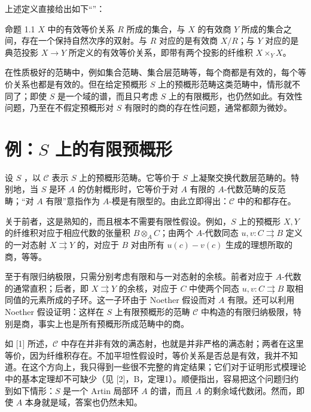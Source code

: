 上述定义直接给出如下“”：

\begin{statement}{命题 1.1}
$X$ 中的有效等价关系 $R$ 所成的集合，与 $X$ 的有效商 $Y$ 所成的集合之间，存在一个保持自然次序的双射。与 $R$ 对应的是有效商 $X/R$；与 $Y$ 对应的是典范投影 $X\to Y$ 所定义的有效等价关系，即带有两个投影的纤维积 $X\times_YX$。
\end{statement}

在性质极好的范畴中，例如集合范畴、集合层范畴等，每个商都是有效的，每个等价关系也都是有效的。但在给定预概形 $S$ 上的预概形范畴这类范畴中，情形就不同了；即使 $S$ 是一个域的谱，而且只考虑 $S$ 上的有限概形，也仍然如此。有效性问题，乃至在不假定预概形对 $S$ 有限时的商的存在性问题，通常都颇为微妙。

\section{例：$S$ 上的有限预概形}
设 $S$ ，以 $\mathcal C$ 表示 $S$ 上的预概形范畴。它等价于 $S$ 上凝聚交换代数层范畴的。特别地，当 $S$ 是环 $A$ 的仿射概形时，它等价于对 $A$ 有限的 $A$-代数范畴的反范畴；“对 $A$ 有限”意指作为 $A$-模是有限型的。由此立即得出：$\mathcal C$ 中的和都存在。

关于前者，这是熟知的，而且根本不需要有限性假设。例如，$S$ 上的预概形 $X,Y$ 的纤维积对应于相应代数的张量积 $B\otimes_AC$；由两个 $A$-代数同态 $u,v:C\rightrightarrows B$ 定义的一对态射 $X\rightrightarrows Y$ 的，对应于 $B$ 对由所有 $u(c)-v(c)$ 生成的理想所取的商，等等。

至于有限归纳极限，只需分别考虑有限和与一对态射的余核。前者对应于 $A$-代数的通常直积；后者，即 $X\rightrightarrows Y$ 的余核，对应于 $C$ 中使两个同态 $u,v:C\rightrightarrows B$ 取相同值的元素所成的子环。这一子环由于 Noether 假设而对 $A$ 有限。还可以利用 Noether 假设证明：这样在 $S$ 上有限预概形的范畴 $\mathcal C$ 中构造的有限归纳极限，特别是商，事实上也是所有预概形所成范畴中的商。

如 [1] 所述，$\mathcal C$ 中存在并非有效的满态射，也就是并非严格的满态射；两者在这里等价，因为纤维积存在。不加平坦性假设时，等价关系是否总是有效，我并不知道。在这个方向上，我只得到一些很不完整的肯定结果；它们对于证明形式模理论中的基本定理却不可缺少（见 [2]，B，定理1）。顺便指出，容易把这个问题归约到如下情形：$S$ 是一个 Artin 局部环 $A$ 的谱，而且 $A$ 的剩余域代数闭。然而，即使 $A$ 本身就是域，答案也仍然未知。

